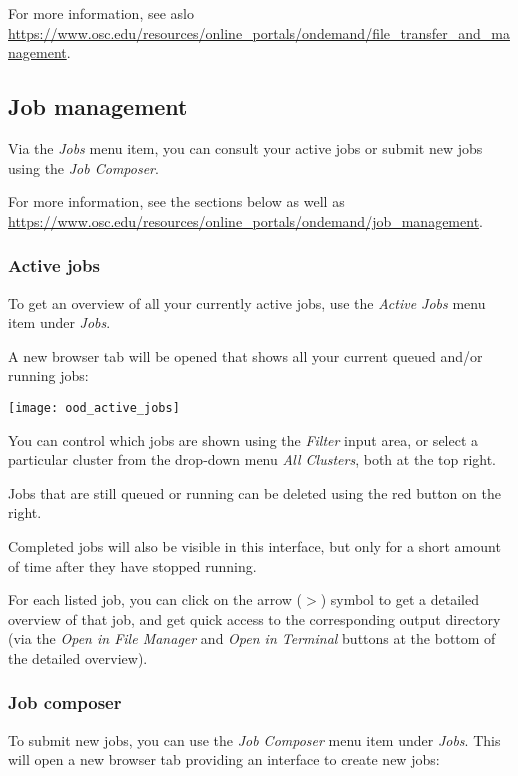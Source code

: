 For more information, see aslo \url{https://www.osc.edu/resources/online_portals/ondemand/file_transfer_and_management}.


\subsection{Job management}

Via the \emph{Jobs} menu item, you can consult your active jobs or submit new jobs using the \emph{Job Composer}.

For more information, see the sections below as well as
\url{https://www.osc.edu/resources/online_portals/ondemand/job_management}.

\subsubsection{Active jobs}

To get an overview of all your currently active jobs,
use the \emph{Active Jobs} menu item under \emph{Jobs}.

A new browser tab will be opened that shows all your current queued and/or running jobs:

\begin{center}
    \texttt{[image: ood\_active\_jobs]}
\end{center}

You can control which jobs are shown using the \emph{Filter} input area,
or select a particular cluster from the drop-down menu \emph{All Clusters}, both at the top right.

Jobs that are still queued or running can be deleted using the red button on the right.

Completed jobs will also be visible in this interface, but only for a short amount of time after they have stopped running.

For each listed job, you can click on the arrow ($>$) symbol to get a detailed overview of that job,
and get quick access to the corresponding output directory (via the \emph{Open in File Manager} and \emph{Open in Terminal} buttons at the bottom of the detailed overview).

\subsubsection{Job composer}

To submit new jobs, you can use the \emph{Job Composer} menu item under \emph{Jobs}.
This will open a new browser tab providing an interface to create new jobs:

